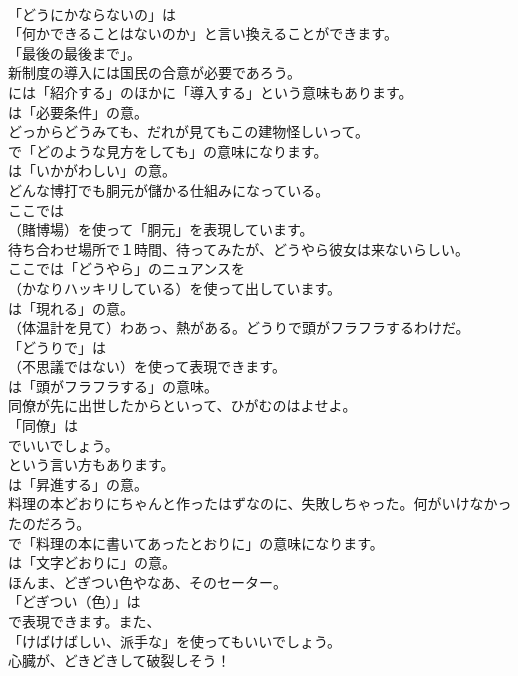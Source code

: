 \documentclass[8pt]{extreport}
\begin{document}
\begin{CJK}{UTF8}{min}
\\	「どうにかならないの」は
\\	「何かできることはないのか」と言い換えることができます。
\\	「最後の最後まで」。	
\\	新制度の導入には国民の合意が必要であろう。 
\\	には「紹介する」のほかに「導入する」という意味もあります。
\\	は「必要条件」の意。	
\\	どっからどうみても、だれが見てもこの建物怪しいって。 
\\	で「どのような見方をしても」の意味になります。
\\	は「いかがわしい」の意。	
\\	どんな博打でも胴元が儲かる仕組みになっている。 
\\	ここでは 
\\	（賭博場）を使って「胴元」を表現しています。	
\\	待ち合わせ場所で１時間、待ってみたが、どうやら彼女は来ないらしい。 
\\	ここでは「どうやら」のニュアンスを
\\	（かなりハッキリしている）を使って出しています。
\\	は「現れる」の意。	
\\	（体温計を見て）わあっ、熱がある。どうりで頭がフラフラするわけだ。 
\\	「どうりで」は
\\	（不思議ではない）を使って表現できます。
\\	は「頭がフラフラする」の意味。	
\\	同僚が先に出世したからといって、ひがむのはよせよ。 
\\	「同僚」は 
\\	でいいでしょう。
\\	という言い方もあります。
\\	は「昇進する」の意。	
\\	料理の本どおりにちゃんと作ったはずなのに、失敗しちゃった。何がいけなかったのだろう。 
\\	で「料理の本に書いてあったとおりに」の意味になります。
\\	は「文字どおりに」の意。	
\\	ほんま、どぎつい色やなあ、そのセーター。 
\\	「どぎつい（色）」は
\\	で表現できます。また、
\\	「けばけばしい、派手な」を使ってもいいでしょう。	
\\	心臓が、どきどきして破裂しそう！ 

\end{CJK}
\end{document}
